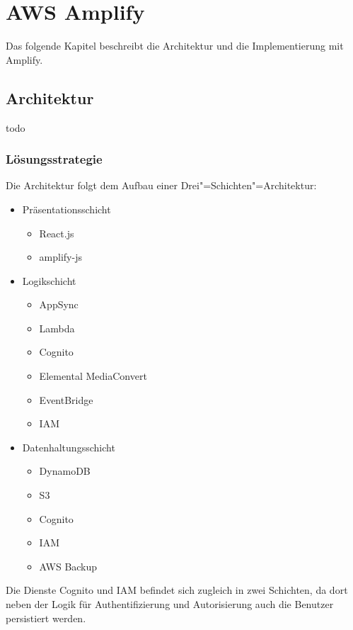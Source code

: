 \chapter{AWS Amplify}

Das folgende Kapitel beschreibt die Architektur und die Implementierung mit Amplify.

\section{Architektur}

todo

\subsection{Lösungsstrategie}

Die Architektur folgt dem Aufbau einer Drei"=Schichten"=Architektur:
\begin{itemize}
  \item Präsentationsschicht
    \begin{itemize}
      \item React.js
      \item amplify-js
    \end{itemize}
  \item Logikschicht
    \begin{itemize}
      \item AppSync
      \item Lambda
      \item Cognito
      \item Elemental MediaConvert
      \item EventBridge
      \item IAM
    \end{itemize}
  \item Datenhaltungsschicht
    \begin{itemize}
      \item DynamoDB
      \item S3
      \item Cognito
      \item IAM
      \item AWS Backup
    \end{itemize}
\end{itemize}

Die Dienste Cognito und IAM befindet sich zugleich in zwei Schichten, da dort neben der Logik für Authentifizierung und Autorisierung auch die Benutzer persistiert werden.

